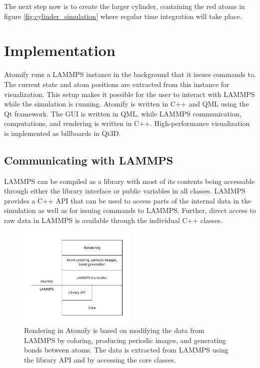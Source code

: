 \documentclass[aps,pre,twocolumn,letterpaper,floatfix,nofootinbib]{revtex4}
\begin{document}
The next step now is to create the larger cylinder, containing the red atoms in figure \ref{fig:cylinder_simulation} where regular time integration will take place.

\section{\label{sec:implementation}Implementation}

Atomify runs a LAMMPS instance in the background that it issues commands to.
The current state and atom positions are extracted from this instance for
visualization.
This setup makes it possible for the user to interact with LAMMPS while the
simulation is running.
Atomify is written in C++ and QML using the Qt framework.
The GUI is written in QML, while LAMMPS communication,
computations, and rendering is written in C++.
High-performance visualization is implemented as billboards in Qt3D.

\subsection{Communicating with LAMMPS}

LAMMPS can be compiled as a library with most of its contents being accessable
through either the library interface or public variables in all classes.
LAMMPS provides a C++ API that can be used to access parts of the internal data
in the simulation as well as for issuing commands to LAMMPS.
Further, direct access to raw data in LAMMPS is available through the individual
C++ classes.

\begin{figure}
	\centering
	\includegraphics[width=0.5\textwidth]{figures/data-pipeline.pdf}
	\caption{Rendering in Atomify is based on modifying the data from LAMMPS
    by coloring, producing periodic images, and generating bonds between atoms.
    The data is extracted from LAMMPS using the library API and by accessing
    the core classes.}
	\label{fig:data-pipeline}
\end{figure}
\end{document}
